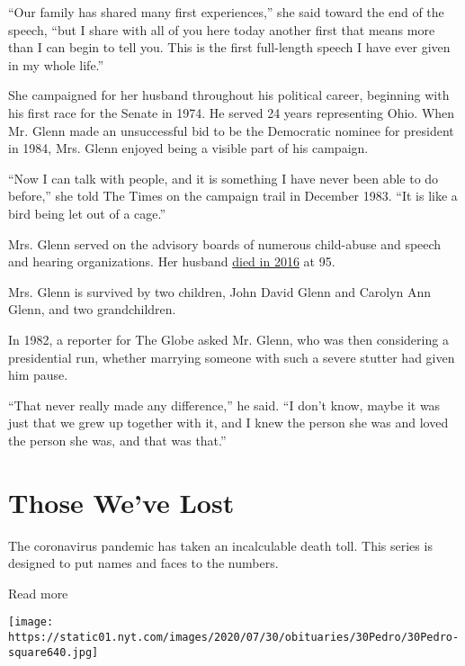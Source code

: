 ``Our family has shared many first experiences,'' she said toward the
end of the speech, ``but I share with all of you here today another
first that means more than I can begin to tell you. This is the first
full-length speech I have ever given in my whole life.''

She campaigned for her husband throughout his political career,
beginning with his first race for the Senate in 1974. He served 24 years
representing Ohio. When Mr. Glenn made an unsuccessful bid to be the
Democratic nominee for president in 1984, Mrs. Glenn enjoyed being a
visible part of his campaign.

``Now I can talk with people, and it is something I have never been able
to do before,'' she told The Times on the campaign trail in December
1983. ``It is like a bird being let out of a cage.''

Mrs. Glenn served on the advisory boards of numerous child-abuse and
speech and hearing organizations. Her husband
\href{https://www.nytimes.com/2016/12/08/us/john-glenn-dies.html}{died
in 2016} at 95.

Mrs. Glenn is survived by two children, John David Glenn and Carolyn Ann
Glenn, and two grandchildren.

In 1982, a reporter for The Globe asked Mr. Glenn, who was then
considering a presidential run, whether marrying someone with such a
severe stutter had given him pause.

``That never really made any difference,'' he said. ``I don't know,
maybe it was just that we grew up together with it, and I knew the
person she was and loved the person she was, and that was that.''

\href{https://www.nytimes.com/interactive/2020/obituaries/people-died-coronavirus-obituaries.html?action=click\&pgtype=Article\&state=default\&region=BELOW_MAIN_CONTENT\&context=covid_obits_promo}{}

\hypertarget{those-weve-lost}{%
\section{Those We've Lost}\label{those-weve-lost}}

The coronavirus pandemic has taken an incalculable death toll. This
series is designed to put names and faces to the numbers.

Read more

\texttt{[image: https://static01.nyt.com/images/2020/07/30/obituaries/30Pedro/30Pedro-square640.jpg]}

